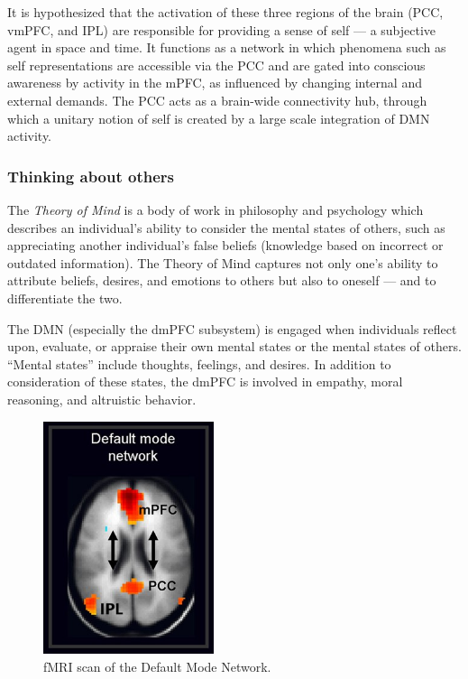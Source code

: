 \documentclass[a4paper, amsfonts, amssymb, amsmath, reprint, showkeys, nofootinbib, twoside]{revtex4-1}
\begin{document}
It is hypothesized that the activation of these three regions of the brain (PCC,
vmPFC, and IPL) are responsible for providing a sense of self --- a subjective agent
in space and time. It functions as a network in which phenomena such as self
representations are accessible via the PCC \cite{mappingself} and are gated into
conscious awareness by activity in the mPFC, as influenced by changing internal
and external demands. The PCC acts as a brain-wide connectivity hub, through which a unitary notion of self is
created by a large scale integration of DMN activity. \cite{mappingself}

\subsubsection{Thinking about others}

The \textit{Theory of Mind} is a body of work in philosophy and psychology which
describes an individual's ability to consider the mental states of others, such as
appreciating another individual's false beliefs (knowledge based on incorrect or
outdated information). The Theory of Mind captures not only one's ability to
attribute beliefs, desires, and emotions to others but also to oneself --- and to
differentiate the two. \cite{autistictheoryofmind}

The DMN (especially the dmPFC subsystem) is engaged when individuals reflect upon,
evaluate, or appraise their own mental states or the mental states of others. ``Mental
states'' include thoughts, feelings, and desires. \cite{theoryofmind} In addition to
consideration of these states, the dmPFC is involved in empathy, moral reasoning,
and altruistic behavior. \cite{defaultnetworkadaptive,dmpfcothers,dmpfcaltruism}

\begin{figure}[H]
  \centering
  \includegraphics[width=5cm]{images/fmri-dmn.jpg}
  \caption{fMRI scan of the Default Mode Network.}
  \label{fig:fmri-dmn}
\end{figure}
\end{document}
